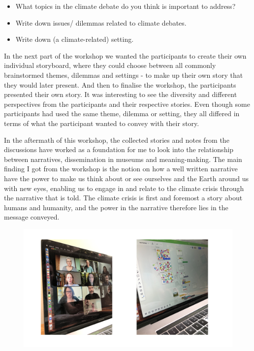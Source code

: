\begin{itemize}
    \item What topics in the climate debate do you think is important to address?
    \item Write down issues/ dilemmas related to climate debates.
    \item Write down (a climate-related) setting.
\end{itemize}

In the next part of the workshop we wanted the participants to create their own individual storyboard, where they could choose between all commonly brainstormed themes, dilemmas and settings - to make up their own story that they would later present. And then to finalise the workshop, the participants presented their own story. It was interesting to see the diversity and different perspectives from the participants and their respective stories. Even though some participants had used the same theme, dilemma or setting, they all differed in terms of what the participant wanted to convey with their story. 

In the aftermath of this workshop, the collected stories and notes from the discussions have worked as a foundation for me to look into the relationship between narratives, dissemination in museums and meaning-making. The main finding I got from the workshop is the notion on how a well written narrative have the power to make us think about or see ourselves and the Earth around us with new eyes, enabling us to engage in and relate to the climate crisis through the narrative that is told. The climate crisis is first and foremost a story about humans and humanity, and the power in the narrative therefore lies in the message conveyed. 

\begin{figure}[H]
\includegraphics[width=13cm]{pictures/narrative_workshop.png}
\centering 
\end{figure}


